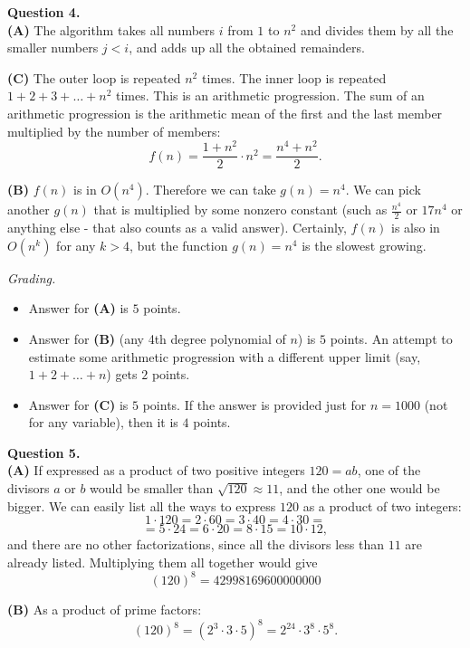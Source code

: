 \documentclass[jou]{apa6}
\begin{document}
\vspace{10pt}
{\bf Question 4.}\\
{\bf (A)} The algorithm takes all numbers $i$ from $1$ to $n^2$ and
divides them by all the smaller numbers $j < i$, and adds up all the obtained remainders.

{\bf (C)} The outer loop is repeated $n^2$ times. The inner loop is repeated
$1 + 2 + 3 + \ldots + n^2$ times. This is an arithmetic progression.
The sum of an arithmetic progression is the arithmetic mean of the first and the last 
member multiplied by the number of members: 
$$f(n) = \frac{1 + n^2}{2} \cdot n^2 = \frac{n^4 + n^2}{2}.$$

{\bf (B)} $f(n)$ is in $O(n^4)$. Therefore we can take $g(n) = n^4$. We can
pick another $g(n)$ that is multiplied by some nonzero constant
(such as $\frac{n^4}{2}$ or $17n^4$ or anything else - that also counts
as a valid answer).  
Certainly, $f(n)$ is also in $O(n^k)$ for any $k > 4$, but the function $g(n) = n^4$ 
is the slowest growing. 

{\scriptsize
{\em Grading.} 
\begin{itemize}
\item Answer for {\bf (A)} is $5$ points.
\item Answer for {\bf (B)} (any 4th degree polynomial of $n$) is $5$ points. 
An attempt to estimate some arithmetic progression with a different upper limit
(say, $1 + 2 + \ldots + n$) gets $2$ points.
\item Answer for {\bf (C)} is $5$ points. If the answer is 
provided just for $n=1000$ (not for any variable), then it is $4$ points.
\end{itemize}
}







\vspace{10pt}
{\bf Question 5.}\\
{\bf (A)} If expressed as a product of two positive integers $120 = ab$, 
one of the divisors $a$ or $b$ would be smaller than $\sqrt{120} \approx 11$, and the other
one would be bigger. We can easily list all the ways to express $120$ 
as a product of two integers: 
$$1 \cdot 120 = 2 \cdot 60 = 3 \cdot 40 = 4 \cdot 30 = $$
$$= 5 \cdot 24 = 6 \cdot 20 = 8 \cdot 15 = 10 \cdot 12,$$
and there are no other factorizations, since all the divisors less than $11$ are
already listed.  
Multiplying them all together would give 
$$(120)^8 = 42998169600000000$$

{\bf (B)} As a product of prime factors:
$$(120)^8 = (2^3 \cdot 3 \cdot 5)^8 = 2^{24} \cdot 3^8 \cdot 5^8.$$
\end{document}
